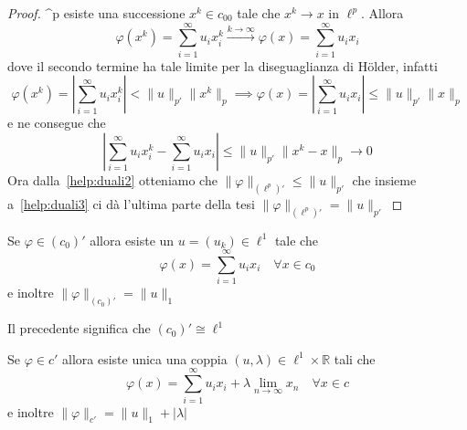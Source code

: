 \begin{proof}
    \ell^{p}\) esiste una successione \(x^{k} \in  c_{00} \) tale che \(x^{k}
    \to x\) in \(\ell^{p}\). Allora 
    \[
        \varphi {(x^{k})} = \sum_{i=1}^{\infty} u_{i} x_{i}^{k}
        \overset{k \to \infty}{\longrightarrow} \varphi {(x)} =
        \sum_{i=1}^{\infty} u_{i} x_{i}
    \]
    dove il secondo termine ha tale limite per la diseguaglianza di Hölder,
    infatti 
    \begin{equation}\label{help:duali2}
      \varphi {(x^{k})} = \left| \sum_{i=1}^{\infty} u_{i} x_{i}^{k}  \right| < \|u\|_{p'}
      \|x^{k}\|_p \implies \varphi {(x)} = \left| \sum_{i=1}^{\infty} u_{i} x_{i}  \right| \le
      \|u\|_{p'} \|x\|_p
    \end{equation}
    e ne consegue che
    \[
      \left| \sum_{i=1}^{\infty} u_{i}x_{i}^{k} - \sum_{i=1}^{\infty} u_{i}x_{i}
      \right| \le \|u\|_{p'} \|x^{k} - x\|_p \to 0
    \]
    Ora dalla~\eqref{help:duali2} otteniamo che \(\|\varphi \|_{{(\ell^{p})}'}
    \le \|u\|_{p'} \)  che insieme a~\eqref{help:duali3} ci dà l'ultima parte
    della tesi \(\|\varphi \|_{{(\ell^{p})}'} = \|u\|_{p'}\) 
\end{proof}
\begin{theorem}
    Se \(\varphi \in {(c_{0})}'\) allora esiste un \(u = {(u_k)} \in \ell^{1}\)
    tale che 
    \[
        \varphi {(x)} = \sum_{i=1}^{\infty} u_{i} x_{i} \quad \forall x \in c_{0} 
    \]
    e inoltre \(\|\varphi \|_{{(c_{0})}'} = \|u\|_1\)
\end{theorem}
\begin{remark}
Il precedente significa che \({(c_{0})}' \cong \ell^{1}\) 
\end{remark}
\begin{theorem}
    Se \(\varphi \in c'\) allora esiste unica una coppia \({(u, \lambda)} \in
    \ell^{1} \times \mathbb{R}\) tali che
    \[
      \varphi {(x)} = \sum_{i=1}^{\infty} u_{i}x_{i} + \lambda \lim_{n \to
      \infty} x_{n} \quad \forall x \in c 
    \]
    e inoltre \(\|\varphi \|_{c'} = \|u\|_1 + |\lambda|\) 
\end{theorem}


